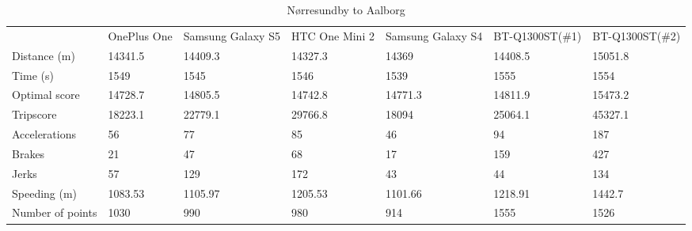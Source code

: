 \begin{table}[]
\centering
\caption{Nørresundby to Aalborg}
\label{my-label}
\begin{tabular}{lllllll}
                 & OnePlus One & Samsung Galaxy S5 & HTC One Mini 2 & Samsung Galaxy S4 & BT-Q1300ST(\#1) & BT-Q1300ST(\#2) \\
Distance (m)     & 14341.5     & 14409.3           & 14327.3        & 14369             & 14408.5         & 15051.8         \\
Time (s)         & 1549        & 1545              & 1546           & 1539              & 1555            & 1554            \\
Optimal score    & 14728.7     & 14805.5           & 14742.8        & 14771.3           & 14811.9         & 15473.2         \\
Tripscore        & 18223.1     & 22779.1           & 29766.8        & 18094             & 25064.1         & 45327.1         \\
Accelerations    & 56          & 77                & 85             & 46                & 94              & 187             \\
Brakes           & 21          & 47                & 68             & 17                & 159             & 427             \\
Jerks            & 57          & 129               & 172            & 43                & 44              & 134             \\
Speeding (m)     & 1083.53     & 1105.97           & 1205.53        & 1101.66           & 1218.91         & 1442.7          \\
Number of points & 1030        & 990               & 980            & 914               & 1555            & 1526           
\end{tabular}
\end{table}
